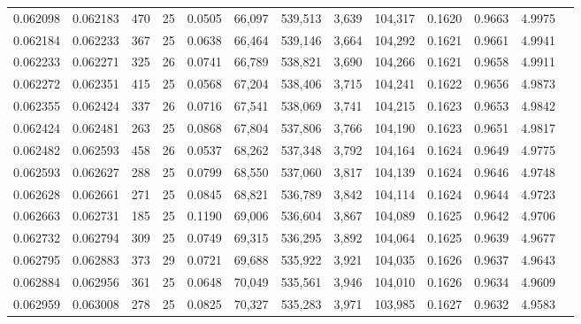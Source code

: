 \begin{tabular}{rrrrrrrrrrrrr}
0.062098 & 0.062183 & 470 &  25 &                                     0.0505 &  66,097 & 539,513 &   3,639 & 104,317 & 0.1620 & 0.9663 & 4.9975 \\
0.062184 & 0.062233 & 367 &  25 &                                     0.0638 &  66,464 & 539,146 &   3,664 & 104,292 & 0.1621 & 0.9661 & 4.9941 \\
0.062233 & 0.062271 & 325 &  26 &                                     0.0741 &  66,789 & 538,821 &   3,690 & 104,266 & 0.1621 & 0.9658 & 4.9911 \\
0.062272 & 0.062351 & 415 &  25 &                                     0.0568 &  67,204 & 538,406 &   3,715 & 104,241 & 0.1622 & 0.9656 & 4.9873 \\
0.062355 & 0.062424 & 337 &  26 &                                     0.0716 &  67,541 & 538,069 &   3,741 & 104,215 & 0.1623 & 0.9653 & 4.9842 \\
0.062424 & 0.062481 & 263 &  25 &                                     0.0868 &  67,804 & 537,806 &   3,766 & 104,190 & 0.1623 & 0.9651 & 4.9817 \\
0.062482 & 0.062593 & 458 &  26 &                                     0.0537 &  68,262 & 537,348 &   3,792 & 104,164 & 0.1624 & 0.9649 & 4.9775 \\
0.062593 & 0.062627 & 288 &  25 &                                     0.0799 &  68,550 & 537,060 &   3,817 & 104,139 & 0.1624 & 0.9646 & 4.9748 \\
0.062628 & 0.062661 & 271 &  25 &                                     0.0845 &  68,821 & 536,789 &   3,842 & 104,114 & 0.1624 & 0.9644 & 4.9723 \\
0.062663 & 0.062731 & 185 &  25 &                                     0.1190 &  69,006 & 536,604 &   3,867 & 104,089 & 0.1625 & 0.9642 & 4.9706 \\
0.062732 & 0.062794 & 309 &  25 &                                     0.0749 &  69,315 & 536,295 &   3,892 & 104,064 & 0.1625 & 0.9639 & 4.9677 \\
0.062795 & 0.062883 & 373 &  29 &                                     0.0721 &  69,688 & 535,922 &   3,921 & 104,035 & 0.1626 & 0.9637 & 4.9643 \\
0.062884 & 0.062956 & 361 &  25 &                                     0.0648 &  70,049 & 535,561 &   3,946 & 104,010 & 0.1626 & 0.9634 & 4.9609 \\
0.062959 & 0.063008 & 278 &  25 &                                     0.0825 &  70,327 & 535,283 &   3,971 & 103,985 & 0.1627 & 0.9632 & 4.9583 \\

\end{tabular}
